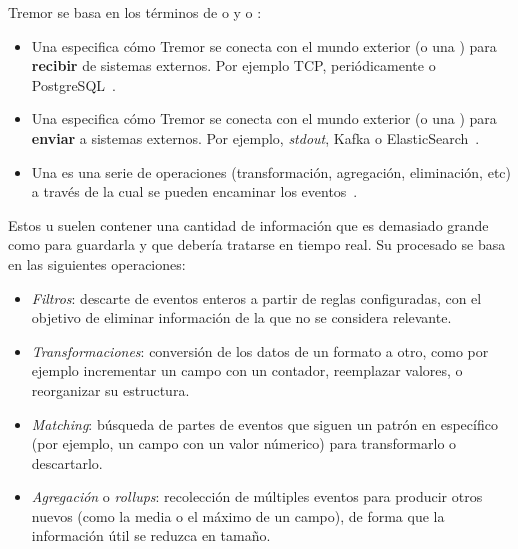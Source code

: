 Tremor se basa en los términos de \onramps o \sources y \offramps o \sinks:

\begin{itemize}
    \item Una \onramp especifica cómo Tremor se conecta con el mundo exterior (o
        una \pipeline) para \textbf{recibir} de sistemas externos. Por ejemplo
        TCP, periódicamente o PostgreSQL~\cite{tremoronramps}.

    \item Una \offramp especifica cómo Tremor se conecta con el mundo exterior
        (o una \pipeline) para \textbf{enviar} a sistemas externos. Por ejemplo,
        \emph{stdout}, Kafka o ElasticSearch~\cite{tremorofframps}.

    \item Una \pipeline es una serie de operaciones (transformación, agregación,
        eliminación, etc) a través de la cual se pueden encaminar los
        eventos~\cite{tremorpipelines}.

\end{itemize}

Estos \onramps u \offramps suelen contener una cantidad de información que es
demasiado grande como para guardarla y que debería tratarse en tiempo real. Su
procesado se basa en las siguientes operaciones:

\begin{itemize}
    \item \emph{Filtros}: descarte de eventos enteros a partir de reglas
        configuradas, con el objetivo de eliminar información de la \pipeline
        que no se considera relevante.

    \item \emph{Transformaciones}: conversión de los datos de un formato a otro,
        como por ejemplo incrementar un campo con un contador, reemplazar
        valores, o reorganizar su estructura.

    \item \emph{Matching}: búsqueda de partes de eventos que siguen un patrón en
        específico (por ejemplo, un campo  con un valor númerico)
        para transformarlo o descartarlo.

    \item \emph{Agregación} o \emph{rollups}: recolección de múltiples eventos
        para producir otros nuevos (como la media o el máximo de un campo), de
        forma que la información útil se reduzca en tamaño.

\end{itemize}

